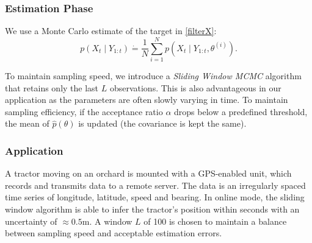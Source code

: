 \documentclass{beamer}
\begin{document}
\begin{frame}
\frametitle{Estimation Phase}

We use a Monte Carlo estimate of the target in \eqref{filterX}:
\begin{equation}
p(X_t\mid Y_{1:t}) \dot{=} \frac{1}{N}\sum_{i=1}^{N}p(X_t\mid Y_{1:t},\theta^{(i)}). 
\end{equation}

To maintain sampling speed, we introduce a \textit{Sliding Window MCMC} algorithm that retains only the last $L$ observations. This is also advantageous in our application as the parameters are often slowly varying in time. To maintain sampling efficiency, if the acceptance ratio $\alpha$ drops below a predefined threshold, the mean of $\hat{p}(\theta)$ is updated (the covariance is kept the same). 

\end{frame}





\begin{frame}
\frametitle{Application}
A tractor moving on an orchard is mounted with a GPS-enabled unit, which records
and transmits data to a remote server. The data is an irregularly spaced time series of longitude, latitude, speed and bearing. In online mode, the sliding window algorithm is able to infer the tractor's position within seconds with an uncertainty of $\approx 0.5\text{m}$. A window $L$ of 100 is chosen to maintain a balance between sampling speed and acceptable estimation errors. 
\end{frame}


%
\end{document}

